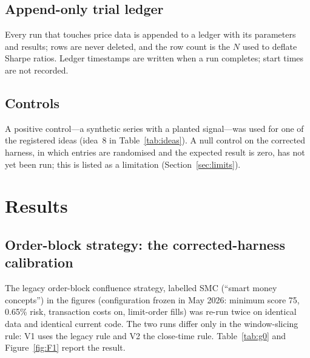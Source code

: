 \documentclass[11pt,a4paper]{article}
\begin{document}
\subsection{Append-only trial ledger}
Every run that touches price data is appended to a ledger with its parameters and results; rows
are never deleted, and the row count is the $N$ used to deflate Sharpe ratios. Ledger timestamps
are written when a run completes; start times are not recorded. %

\subsection{Controls}
A positive control---a synthetic series with a planted signal---was used for one of the
registered ideas (idea~8 in Table~\ref{tab:ideas}). A null control on the corrected harness, in
which entries are randomised and the expected result is zero, has not yet been run; this is
listed as a limitation (Section~\ref{sec:limits}).

\FloatBarrier
\section{Results}
\label{sec:results}

\subsection{Order-block strategy: the corrected-harness calibration}
\label{sec:res-g0}

The legacy order-block confluence strategy, labelled SMC (``smart money concepts'') in the
figures (configuration frozen in May 2026: minimum score 75,
0.65\% risk, transaction costs on, limit-order fills) was re-run twice on identical data and
identical current code. %
The two runs differ only in the window-slicing rule: V1 uses the legacy rule and V2 the
close-time rule. Table~\ref{tab:g0} and Figure~\ref{fig:F1} report the result.
\end{document}
